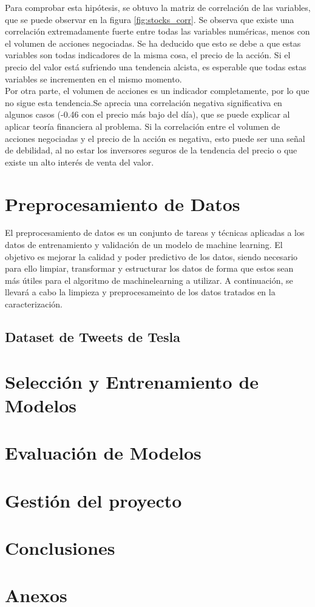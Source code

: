 \documentclass[a4paper, 12pt]{report}
\begin{document}
                        Para comprobar esta hipótesis, se obtuvo la matriz de correlación de las variables, que se puede observar en la figura \ref{fig:stocks_corr}.
                        Se observa que existe una correlación extremadamente fuerte entre todas las variables numéricas, menos con el volumen de acciones negociadas.
                        Se ha deducido que esto se debe a que estas variables son todas indicadores de la misma cosa, el precio de la acción. Si el precio del valor
                        está sufriendo una tendencia alcista, es esperable que todas estas variables se incrementen en el mismo momento.\\
                        
                        Por otra parte, el volumen de acciones es un indicador completamente, por lo que no sigue esta tendencia.Se aprecia una correlación negativa significativa en algunos casos
                        (-0.46 con el precio más bajo del día), que se puede explicar al aplicar teoría financiera al problema. Si la correlación entre el volumen de acciones negociadas y el precio de la acción es negativa, 
                        esto puede ser una señal de debilidad, al no estar los inversores seguros de la tendencia del precio o que existe un alto interés de venta del valor.\\
                        
    \chapter{Preprocesamiento de Datos}

                El preprocesamiento de datos es un conjunto de tareas y técnicas aplicadas a los datos de entrenamiento y validación de un modelo de machine learning. El objetivo es 
                mejorar la calidad y poder predictivo de los datos, siendo necesario para ello limpiar, transformar y estructurar los datos de forma que estos sean más útiles para el algoritmo de machinelearning a utilizar.
                A continuación, se llevará a cabo la limpieza y preprocesameinto de los datos tratados en la caracterización.

                \section{Dataset de Tweets de Tesla}
                

                        

    \chapter{Selección y Entrenamiento de Modelos}
    \chapter{Evaluación de Modelos}
    \chapter{Gestión del proyecto}
    \chapter{Conclusiones}
    
        
    \chapter{Anexos}
\end{document}
